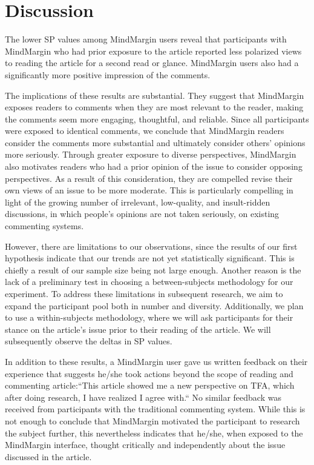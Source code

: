 \section{Discussion}

The lower SP values among MindMargin users reveal that participants with MindMargin who had prior exposure to the article reported less polarized views to reading the article for a second read or glance. MindMargin users also had a significantly more positive impression of the comments. 

The implications of these results are substantial. They suggest that MindMargin exposes readers to comments when they are most relevant to the reader, making the comments seem more engaging, thoughtful, and reliable. Since all participants were exposed to identical comments, we conclude that MindMargin readers consider the comments more substantial and ultimately consider others' opinions more seriously. Through greater exposure to diverse perspectives, MindMargin also motivates readers who had a prior opinion of the issue to consider opposing perspectives. As a result of this consideration, they are compelled revise their own views of an issue to be more moderate. This is particularly compelling in light of the growing number of irrelevant, low-quality, and insult-ridden discussions, in which people's opinions are not taken seriously, on existing commenting systems.

However, there are limitations to our observations, since the results of our first hypothesis indicate that our trends are not yet statistically significant. This is chiefly a result of our sample size being not large enough. Another reason is the lack of a preliminary test in choosing a between-subjects methodology for our experiment. To address these limitations in subsequent research, we aim to expand the participant pool both in number and diversity. Additionally, we plan to use a within-subjects methodology, where we will ask participants for their stance on the article's issue prior to their reading of the article. We will subsequently observe the deltas in SP values.

In addition to these results, a MindMargin user gave us written feedback on their experience that suggests he/she took actions beyond the scope of reading and commenting article:``This article showed me a new perspective on TFA, which after doing research, I have realized I agree with.`` No similar feedback was received from participants with the traditional commenting system. While this is not enough to conclude that MindMargin motivated the participant to research the subject further, this nevertheless indicates that he/she, when exposed to the MindMargin interface, thought critically and independently about the issue discussed in the article.